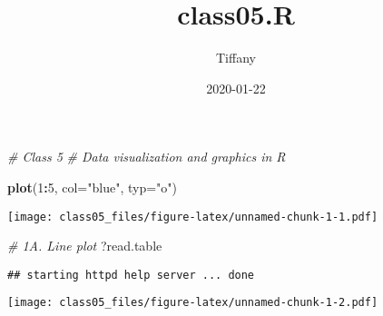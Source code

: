 \documentclass[]{article}
\title{class05.R}
\author{Tiffany}
\date{2020-01-22}
\newenvironment{Shaded}{\begin{snugshade}}{\end{snugshade}}
\newcommand{\KeywordTok}[1]{\textcolor[rgb]{0.13,0.29,0.53}{\textbf{#1}}}
\newcommand{\DataTypeTok}[1]{\textcolor[rgb]{0.13,0.29,0.53}{#1}}
\newcommand{\DecValTok}[1]{\textcolor[rgb]{0.00,0.00,0.81}{#1}}
\newcommand{\FloatTok}[1]{\textcolor[rgb]{0.00,0.00,0.81}{#1}}
\newcommand{\StringTok}[1]{\textcolor[rgb]{0.31,0.60,0.02}{#1}}
\newcommand{\CommentTok}[1]{\textcolor[rgb]{0.56,0.35,0.01}{\textit{#1}}}
\newcommand{\OtherTok}[1]{\textcolor[rgb]{0.56,0.35,0.01}{#1}}
\newcommand{\OperatorTok}[1]{\textcolor[rgb]{0.81,0.36,0.00}{\textbf{#1}}}
\newcommand{\NormalTok}[1]{#1}
\begin{document}
\maketitle

\begin{Shaded}
\begin{Highlighting}[]
\CommentTok{# Class 5}
\CommentTok{# Data visualization and graphics in R}

\KeywordTok{plot}\NormalTok{(}\DecValTok{1}\OperatorTok{:}\DecValTok{5}\NormalTok{, }\DataTypeTok{col=}\StringTok{"blue"}\NormalTok{, }\DataTypeTok{typ=}\StringTok{"o"}\NormalTok{)}
\end{Highlighting}
\end{Shaded}

\texttt{[image: class05\_files/figure-latex/unnamed-chunk-1-1.pdf]}

\begin{Shaded}
\begin{Highlighting}[]
\CommentTok{# 1A. Line plot}
\NormalTok{?read.table}
\end{Highlighting}
\end{Shaded}

\begin{verbatim}
## starting httpd help server ... done
\end{verbatim}

\begin{Shaded}
\end{Shaded}

\texttt{[image: class05\_files/figure-latex/unnamed-chunk-1-2.pdf]}
\end{document}
